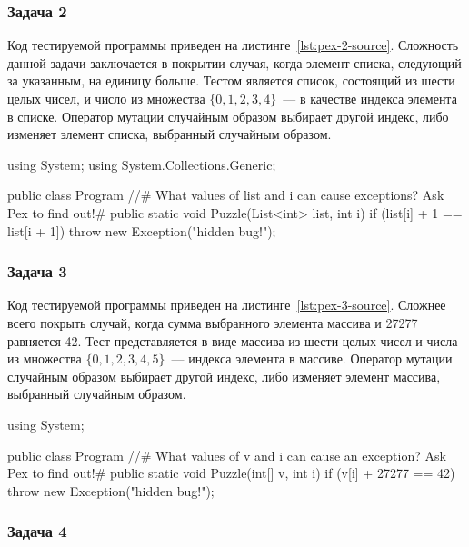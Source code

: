 \subsubsection{Задача 2}

Код тестируемой программы приведен на листинге~\ref{lst:pex-2-source}. Сложность данной задачи заключается в покрытии случая, когда элемент списка, следующий 
за указанным, на единицу больше. Тестом является список, состоящий из шести целых чисел, и число из множества $\{0, 1, 2, 3, 4\}$~--- в качестве индекса 
элемента в списке. Оператор мутации случайным образом выбирает другой индекс, либо изменяет элемент списка, выбранный случайным образом.  

\begin{snippet}[language=C++,caption={Код задачи 2 с сайта pexforfun},label={lst:pex-2-source}]
using System;
using System.Collections.Generic;

public class Program
{
  //# What values of list and i can cause exceptions? Ask Pex to find out!#
  public static void Puzzle(List<int> list, int i)
  {
    if (list[i] + 1 == list[i + 1])
      throw new Exception("hidden bug!"); 
  }
}
\end{snippet}

\subsubsection{Задача 3}
                   
Код тестируемой программы приведен на листинге~\ref{lst:pex-3-source}. Сложнее всего покрыть случай, когда сумма выбранного элемента массива и 27277 равняется 
42. Тест представляется в виде массива из шести целых чисел и числа из множества $\{0, 1, 2, 3, 4, 5\}$~--- индекса элемента в массиве. Оператор мутации 
случайным образом выбирает другой индекс, либо изменяет элемент массива, выбранный случайным образом.  

\begin{snippet}[language=C++,caption={Код задачи 3 с сайта pexforfun},label={lst:pex-3-source}]
using System;

public class Program {
  //# What values of v and i can cause an exception? Ask Pex to find out!#
  public static void Puzzle(int[] v, int i) {
    if (v[i] + 27277 == 42)
      throw new Exception("hidden bug!"); 
  }
}
\end{snippet}

\subsubsection{Задача 4}
                   
